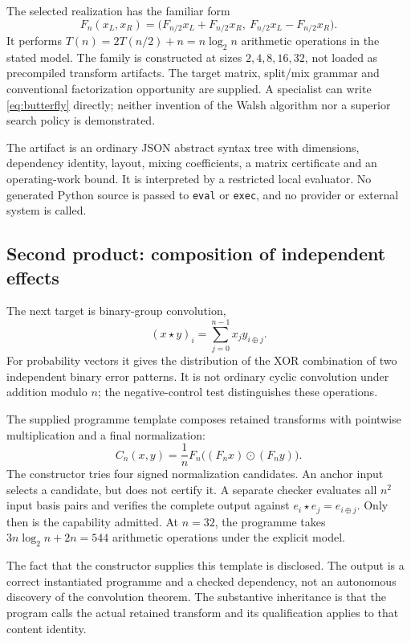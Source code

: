 \documentclass[11pt,letterpaper]{article}
\theoremstyle{definition}\newtheorem{definition}[theorem]{Definition}
\theoremstyle{remark}\newtheorem{remark}[theorem]{Remark}
\begin{document}
The selected realization has the familiar form
\begin{equation}
 F_n(x_L,x_R)=\big(F_{n/2}x_L+F_{n/2}x_R,\ F_{n/2}x_L-F_{n/2}x_R\big).
 \label{eq:butterfly}
\end{equation}
It performs $T(n)=2T(n/2)+n=n\log_2n$ arithmetic operations in the stated model. The family is constructed at sizes $2,4,8,16,32$, not loaded as precompiled transform artifacts. The target matrix, split/mix grammar and conventional factorization opportunity are supplied. A specialist can write \eqref{eq:butterfly} directly; neither invention of the Walsh algorithm nor a superior search policy is demonstrated.

The artifact is an ordinary JSON abstract syntax tree with dimensions, dependency identity, layout, mixing coefficients, a matrix certificate and an operating-work bound. It is interpreted by a restricted local evaluator. No generated Python source is passed to \texttt{eval} or \texttt{exec}, and no provider or external system is called.

\subsection{Second product: composition of independent effects}
The next target is binary-group convolution,
\begin{equation}
 (x\star y)_i=\sum_{j=0}^{n-1}x_jy_{i\oplus j}.
 \label{eq:conv}
\end{equation}
For probability vectors it gives the distribution of the XOR combination of two independent binary error patterns. It is not ordinary cyclic convolution under addition modulo $n$; the negative-control test distinguishes these operations.

The supplied programme template composes retained transforms with pointwise multiplication and a final normalization:
\begin{equation}
 C_n(x,y)=\frac1nF_n\big((F_nx)\odot(F_ny)\big).
 \label{eq:conv_program}
\end{equation}
The constructor tries four signed normalization candidates. An anchor input selects a candidate, but does not certify it. A separate checker evaluates all $n^2$ input basis pairs and verifies the complete output against $e_i\star e_j=e_{i\oplus j}$. Only then is the capability admitted. At $n=32$, the programme takes $3n\log_2n+2n=544$ arithmetic operations under the explicit model.

The fact that the constructor supplies this template is disclosed. The output is a correct instantiated programme and a checked dependency, not an autonomous discovery of the convolution theorem. The substantive inheritance is that the program calls the actual retained transform and its qualification applies to that content identity.
\end{document}
